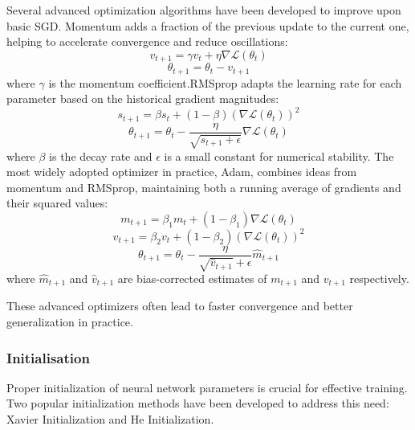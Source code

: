 \documentclass[a4paper, oneside]{discothesis}
\begin{document}
Several advanced optimization algorithms have been developed to improve upon basic SGD. Momentum adds a fraction of the previous update to the current one, helping to accelerate convergence and reduce oscillations:
\begin{equation}
    v_{t+1} = \gamma v_t + \eta \nabla \mathcal{L}(\theta_t)
\end{equation}
\begin{equation}
    \theta_{t+1} = \theta_t - v_{t+1}
\end{equation}
where $\gamma$ is the momentum coefficient.RMSprop adapts the learning rate for each parameter based on the historical gradient magnitudes:
\begin{equation}
    s_{t+1} = \beta s_t + (1-\beta)(\nabla \mathcal{L}(\theta_t))^2
\end{equation}
\begin{equation}
    \theta_{t+1} = \theta_t - \frac{\eta}{\sqrt{s_{t+1} + \epsilon}} \nabla \mathcal{L}(\theta_t)
\end{equation}
where $\beta$ is the decay rate and $\epsilon$ is a small constant for numerical stability.
The most widely adopted optimizer in practice, Adam, combines ideas from momentum and RMSprop, maintaining both a running average of gradients and their squared values:
\begin{equation}
    m_{t+1} = \beta_1 m_t + (1-\beta_1)\nabla \mathcal{L}(\theta_t)
\end{equation}
\begin{equation}
    v_{t+1} = \beta_2 v_t + (1-\beta_2)(\nabla \mathcal{L}(\theta_t))^2
\end{equation}
\begin{equation}
    \theta_{t+1} = \theta_t - \frac{\eta}{\sqrt{\hat{v}_{t+1}} + \epsilon} \hat{m}_{t+1}
\end{equation}
where $\hat{m}_{t+1}$ and $\hat{v}_{t+1}$ are bias-corrected estimates of $m_{t+1}$ and $v_{t+1}$ respectively.

These advanced optimizers often lead to faster convergence and better generalization in practice.

\subsubsection{Initialisation}

Proper initialization of neural network parameters is crucial for effective training. Two popular initialization methods have been developed to address this need: Xavier Initialization and He Initialization.
\end{document}
